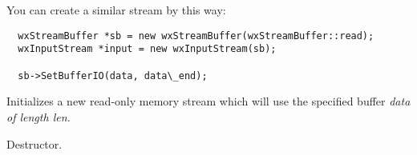 \section{}\label{wxmeminputstream}






You can create a similar stream by this way:

\begin{verbatim}
  wxStreamBuffer *sb = new wxStreamBuffer(wxStreamBuffer::read);
  wxInputStream *input = new wxInputStream(sb);

  sb->SetBufferIO(data, data\_end);
\end{verbatim}




Initializes a new read-only memory stream which will use the specified buffer
\it{data} of length \it{len}.



Destructor.

\section{}\label{wxmemoutputstream}




